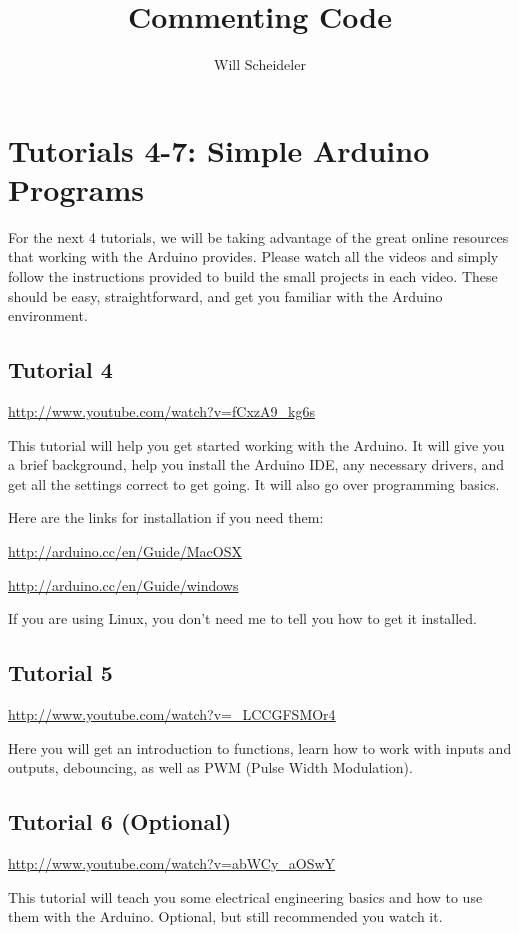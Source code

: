 \documentclass[10pt]{report}
\title{Commenting Code}
\author{Will Scheideler}
\begin{document}
\section*{Tutorials 4-7: Simple Arduino Programs}

\par For the next 4 tutorials, we will be taking advantage of the great online resources that working with the Arduino provides. Please watch all the videos and simply follow the instructions provided to build the small projects in each video. These should be easy, straightforward, and get you familiar with the Arduino environment.

\subsection*{Tutorial 4}
\par \url{http://www.youtube.com/watch?v=fCxzA9_kg6s}
\par
This tutorial will help you get started working with the Arduino. It will give you a brief background, help you install the Arduino IDE, any necessary drivers, and get all the settings correct to get going. It will also go over programming basics. 
\par Here are the links for installation if you need them:
\par \url{http://arduino.cc/en/Guide/MacOSX} 
\par \url{http://arduino.cc/en/Guide/windows}
\par If you are using Linux, you don't need me to tell you how to get it installed.

\subsection*{Tutorial 5}
\par \url{http://www.youtube.com/watch?v=_LCCGFSMOr4}
\par Here you will get an introduction to functions, learn how to work with inputs and outputs, debouncing, as well as PWM (Pulse Width Modulation).

\subsection*{Tutorial 6 (Optional)}
\par \url{http://www.youtube.com/watch?v=abWCy_aOSwY}
\par This tutorial will teach you some electrical engineering basics and how to use them with the Arduino. Optional, but still recommended you watch it.
\end{document}
